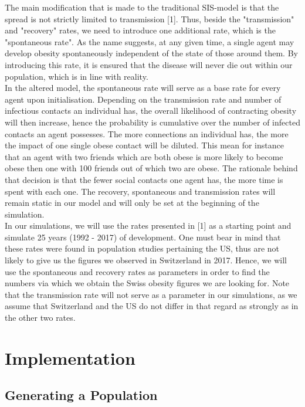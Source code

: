 \documentclass[11pt]{article}
\begin{document}
The main modification that is made to the traditional SIS-model is that the spread is not strictly limited to  transmission [1]. Thus, beside the "transmission" and "recovery" rates, we need to introduce one additional rate, which is the "spontaneous rate". As the name suggests, at any given time, a single agent may develop obesity spontaneously independent of the state of those around them. By introducing this rate, it is ensured that the disease will never die out within our population, which is in line with reality.\\

In the altered model, the spontaneous rate will serve as a base rate for every agent upon initialisation. Depending on the transmission rate and number of infectious contacts an individual has, the overall likelihood of contracting obesity will then increase, hence the probability is cumulative over the number of infected contacts an agent possesses. The more connections an individual has, the more the impact of one single obese contact will be diluted. This mean for instance that an agent with two friends which are both obese is more likely to become obese then one with 100 friends out of which two are obese. The rationale behind that decision is that the fewer social contacts one agent has, the more time is spent with each one. The recovery, spontaneous and transmission rates will remain static in our model and will only be set at the beginning of the simulation.
\\

In our simulations, we will use the rates presented in [1] as a starting point and simulate 25 years (1992 - 2017) of development. One must bear in mind that these rates were found in population studies pertaining the US, thus are not likely to give us the figures we observed in Switzerland in 2017. Hence, we will use the spontaneous and recovery rates as parameters in order to find the numbers via which we obtain the Swiss obesity figures we are looking for. Note that the transmission rate will not serve as a parameter in our simulations, as we assume that Switzerland and the US do not differ in that regard as strongly as in the other two rates.

\section{Implementation}

\subsection{Generating a Population}
\end{document}
